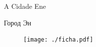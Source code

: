 \newpage
\MyriadPro\itshape
\begin{center}
\small
A Cidade Ene

Город Эн
\end{center}

\scriptsize


\begin{vplace}[1]
\begin{figure}[!ht]
\centering

  \texttt{[image: ./ficha.pdf]}
 \end{figure}
\end{vplace}








